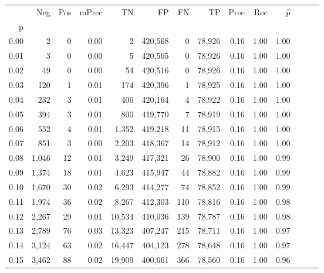 \begin{tabular}{rrrrrrrrrrrrrr}
\toprule
{} &    Neg &    Pos & mPrec &       TN &       FP &      FN &      TP &  Prec &   Rec & $\hat{p}$ \\
p    &        &        &       &          &          &         &         &       &       &           \\
\midrule
0.00 &      2 &      0 &  0.00 &        2 &  420,568 &       0 &  78,926 &  0.16 &  1.00 &      1.00 \\
0.01 &      3 &      0 &  0.00 &        5 &  420,565 &       0 &  78,926 &  0.16 &  1.00 &      1.00 \\
0.02 &     49 &      0 &  0.00 &       54 &  420,516 &       0 &  78,926 &  0.16 &  1.00 &      1.00 \\
0.03 &    120 &      1 &  0.01 &      174 &  420,396 &       1 &  78,925 &  0.16 &  1.00 &      1.00 \\
0.04 &    232 &      3 &  0.01 &      406 &  420,164 &       4 &  78,922 &  0.16 &  1.00 &      1.00 \\
0.05 &    394 &      3 &  0.01 &      800 &  419,770 &       7 &  78,919 &  0.16 &  1.00 &      1.00 \\
0.06 &    552 &      4 &  0.01 &    1,352 &  419,218 &      11 &  78,915 &  0.16 &  1.00 &      1.00 \\
0.07 &    851 &      3 &  0.00 &    2,203 &  418,367 &      14 &  78,912 &  0.16 &  1.00 &      1.00 \\
0.08 &  1,046 &     12 &  0.01 &    3,249 &  417,321 &      26 &  78,900 &  0.16 &  1.00 &      0.99 \\
0.09 &  1,374 &     18 &  0.01 &    4,623 &  415,947 &      44 &  78,882 &  0.16 &  1.00 &      0.99 \\
0.10 &  1,670 &     30 &  0.02 &    6,293 &  414,277 &      74 &  78,852 &  0.16 &  1.00 &      0.99 \\
0.11 &  1,974 &     36 &  0.02 &    8,267 &  412,303 &     110 &  78,816 &  0.16 &  1.00 &      0.98 \\
0.12 &  2,267 &     29 &  0.01 &   10,534 &  410,036 &     139 &  78,787 &  0.16 &  1.00 &      0.98 \\
0.13 &  2,789 &     76 &  0.03 &   13,323 &  407,247 &     215 &  78,711 &  0.16 &  1.00 &      0.97 \\
0.14 &  3,124 &     63 &  0.02 &   16,447 &  404,123 &     278 &  78,648 &  0.16 &  1.00 &      0.97 \\
0.15 &  3,462 &     88 &  0.02 &   19,909 &  400,661 &     366 &  78,560 &  0.16 &  1.00 &      0.96 \\

\end{tabular}
